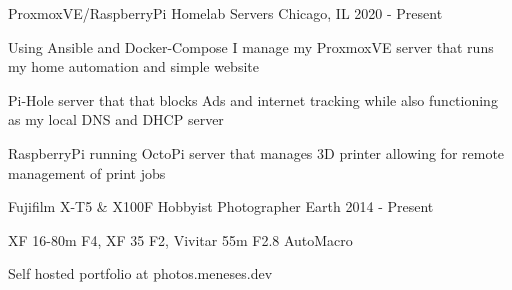 

\begin{cventries}

	\cventry
  {ProxmoxVE/RaspberryPi} %
	{Homelab Servers} %
	{Chicago, IL} %
	{2020 - Present} %
	{
		\begin{cvitems} %
			\item {Using Ansible and Docker-Compose I manage my ProxmoxVE server that runs my home automation and simple website}
			\item {Pi-Hole server that that blocks Ads and internet tracking while also functioning as my local DNS and DHCP server}
			\item {RaspberryPi running OctoPi server that manages 3D printer allowing for remote management of print jobs}
		\end{cvitems}
	}

	\cventry
  {Fujifilm X-T5 \& X100F} %
	{Hobbyist Photographer} %
	{Earth} %
	{2014 - Present} %
	{
		\begin{cvitems} %
      \item {XF 16-80m F4, XF 35 F2, Vivitar 55m F2.8 AutoMacro}
			\item {Self hosted portfolio at photos.meneses.dev}
		\end{cvitems}
	}
\end{cventries}

